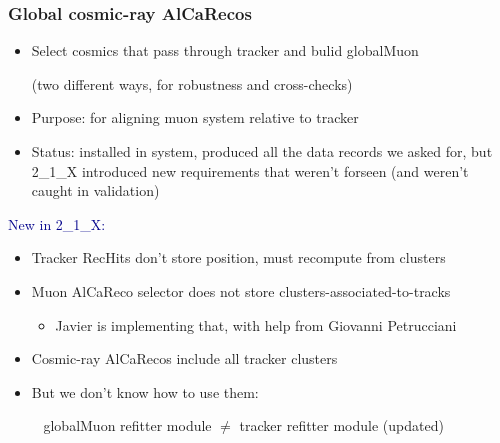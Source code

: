 \documentclass[compress]{beamer}
\begin{document}
\begin{frame}
\frametitle{Global cosmic-ray AlCaRecos}
\small

\begin{itemize}
\item Select cosmics that pass through tracker and bulid globalMuon

(two different ways, for robustness and cross-checks)
\item Purpose: for aligning muon system relative to tracker
\item Status: installed in system, produced all the data records we
  asked for, but 2\_1\_X introduced new requirements that weren't
  forseen (and weren't caught in validation)
\end{itemize}

\vfill
\textcolor{darkblue}{New in 2\_1\_X:}
\begin{itemize}
\item Tracker RecHits don't store position, must recompute from clusters
\item Muon AlCaReco selector does not store \mbox{clusters-associated-to-tracks\hspace{-1 cm}}
\begin{itemize}
\item Javier is implementing that, with help from Giovanni Petrucciani
\end{itemize}
\item Cosmic-ray AlCaRecos include all tracker clusters
\item But we don't know how to use them:

\mbox{ } \hfill globalMuon refitter module $\ne$ tracker refitter module (updated) \hfill \mbox{ }
\end{itemize}
\end{frame}
\end{document}
